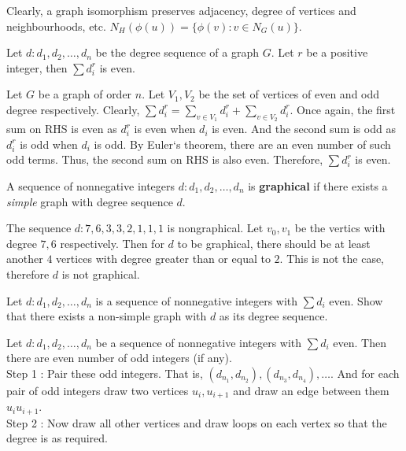 \begin{remark}
	Clearly, a graph isomorphism preserves adjacency, degree of vertices and neighbourhoods, etc.
	$N_H(\phi(u)) = \{ \phi(v) : v \in N_G(u) \}$.
\end{remark}

\begin{exercise}
	Let $d : d_1,d_2,\dots,d_n$ be the degree sequence of a graph $G$.
	Let $r$ be a positive integer, then $\sum d_i^r$ is even.
\end{exercise}
Let $G$ be a graph of order $n$.
Let $V_1,V_2$ be the set of vertices of even and odd degree respectively.
Clearly, $\sum d_i^r = \sum_{v \in V_1} d_i^r + \sum_{v \in V_2} d_i^r$.
Once again, the first sum on RHS is even as $d_i^r$ is even when $d_i$ is even. And the second sum is odd as $d_i^r$ is odd when $d_i$ is odd. By Euler`s theorem, there are an even number of such odd terms. Thus, the second sum on RHS is also even. Therefore, $\sum d_i^r$ is even.

\begin{definition}
	A sequence of nonnegative integers $d : d_1,d_2,\dots,d_n$ is \textbf{graphical} if there exists a \textit{simple} graph with degree sequence $d$.
\end{definition}

\begin{example}
	The sequence $d : 7,6,3,3,2,1,1,1$ is nongraphical. Let $v_0,v_1$ be the vertics with degree $7,6$ respectively. Then for $d$ to be graphical, there should be at least another $4$ vertices with degree greater than or equal to $2$.
	This is not the case, therefore $d$ is not graphical.
\end{example}

\begin{exercise}
	Let $d : d_1,d_2,\dots,d_n$ is a sequence of nonnegative integers with $\sum d_i$ even. Show that there exists a non-simple graph with $d$ as its degree sequence.
\end{exercise}
	Let $d : d_1,d_2,\dots,d_n$ be a sequence of nonnegative integers with $\sum d_i$ even. Then there are even number of odd integers (if any).\\
	Step 1 : Pair these odd integers. That is, $(d_{n_1}, d_{n_2}), (d_{n_3},d_{n_4}),\dots$. And for each pair of odd integers draw two vertices $u_i,u_{i+1}$ and draw an edge between them $u_iu_{i+1}$.\\
	Step 2 : Now draw all other vertices and draw loops on each vertex so that the degree is as required.

